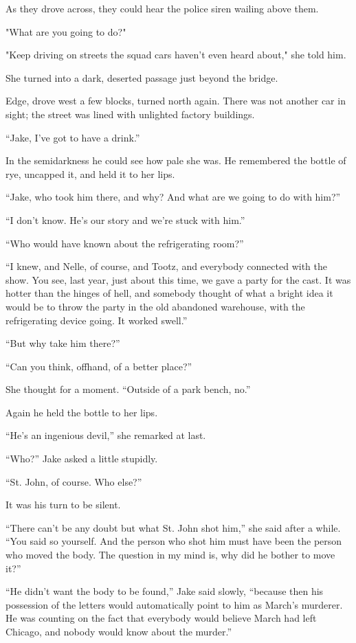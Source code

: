 \documentclass{novel}
\begin{document}
As they drove across, they could hear the police siren wailing above them.

"What are you going to do?"

"Keep driving on streets the squad cars haven't even heard about," she told him.

She turned into a dark, deserted passage just beyond the bridge.

Edge, drove west a few blocks, turned north again. There was not another car in sight; the street was lined with unlighted factory buildings.

“Jake, I've got to have a drink.”

In the semidarkness he could see how pale she was. He remembered the bottle of rye, uncapped it, and held it to her lips.

“Jake, who took him there, and why? And what are we going to do with him?”

“I don’t know. He’s our story and we’re stuck with him.”

“Who would have known about the refrigerating room?”

“I knew, and Nelle, of course, and Tootz, and everybody connected with the show. You see, last year, just about this time, we gave a party for the cast. It was hotter than the hinges of hell, and somebody thought of what a bright idea it would be to throw the party in the old abandoned warehouse, with the refrigerating device going. It worked swell.”

“But why take him there?”

“Can you think, offhand, of a better place?”

She thought for a moment. “Outside of a park bench, no.”

Again he held the bottle to her lips.

“He’s an ingenious devil,” she remarked at last.

“Who?” Jake asked a little stupidly.

“St. John, of course. Who else?”

It was his turn to be silent.

“There can’t be any doubt but what St. John shot him,” she said after a while. “You said so yourself. And the person who shot him must have been the person who moved the body. The question in my mind is, why did he bother to move it?”

“He didn’t want the body to be found,” Jake said slowly, “because then his possession of the letters would automatically point to him as March’s murderer. He was counting on the fact that everybody would believe March had left Chicago, and nobody would know about the murder.”
\end{document}
